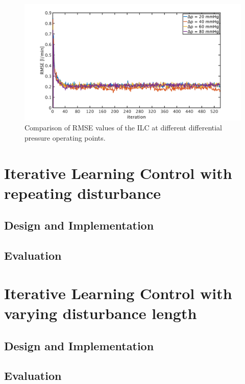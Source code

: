 \begin{figure}[ht]
  \centering
  \includegraphics[width=\textwidth]{images/chapt_5/ILC/RMSE_compare_operating_points.pdf}
  \caption[Comparison of RMSE values of the ILC at different differential pressure operating points]{Comparison of RMSE values of the ILC at different differential pressure operating points.}
  \label{fig:RMSE_compare_operating_points}
\end{figure}
\section{Iterative Learning Control with repeating disturbance}
\subsection{Design and Implementation}

\subsection{Evaluation}
\section{Iterative Learning Control with varying disturbance length}
\subsection{Design and Implementation}
\subsection{Evaluation}
